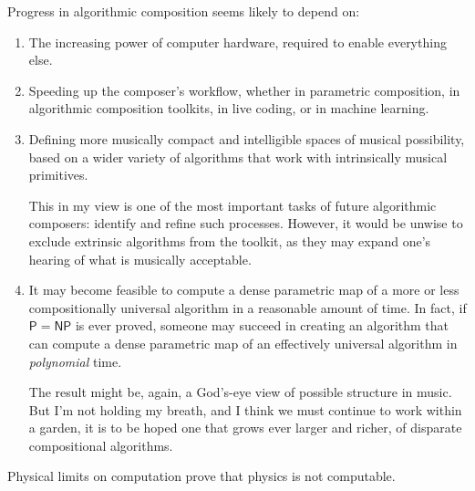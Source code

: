 \documentclass[11pt,papersize=a4]{scrartcl}
\begin{document}
Progress in algorithmic composition seems likely to depend on:

\begin{enumerate}
\item The increasing power of computer hardware, required to enable everything else.
\item Speeding up the composer's workflow, whether in parametric composition, in algorithmic composition toolkits, in live coding, or in machine learning.
\item Defining more musically compact and intelligible spaces of musical possibility, based on a wider variety of algorithms that work with intrinsically musical primitives. 

This in my view is one of the most important tasks of future algorithmic composers: identify and refine such processes. However, it would be unwise to exclude extrinsic algorithms from the toolkit, as they may expand one's hearing of what is musically acceptable.
\item  It may become feasible to compute a dense parametric map of a more or less compositionally universal algorithm in a reasonable amount of time. In fact, if $\mathsf{P} = \mathsf{NP}$ is ever proved, someone may succeed in creating an algorithm that can compute a dense parametric map of an effectively universal algorithm in \emph{polynomial} time. 

The result might be, again, a God's-eye view of possible structure in music. But I'm not holding my breath, and I think we must continue to work within a garden, it is to be hoped one that grows ever larger and richer, of disparate compositional algorithms.
\end{enumerate}

Physical limits on computation prove that physics is not computable.

\printbibliography
\end{document}
